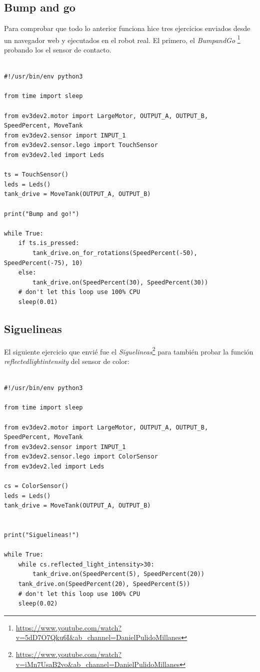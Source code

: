 \subsection{Bump and go}
Para comprobar que todo lo anterior funciona hice tres ejercicios enviados desde un navegador web y ejecutados en el robot real. El primero, el \textit{BumpandGo} \footnote{\url{https://www.youtube.com/watch?v=5dD7O7Qku6I&ab_channel=DanielPulidoMillanes}} probando los el sensor de contacto.

\begin{lstlisting}[frame=single,breaklines=true, label=Bump and Go, caption=Bump and Go,  captionpos=b]

#!/usr/bin/env python3

from time import sleep

from ev3dev2.motor import LargeMotor, OUTPUT_A, OUTPUT_B, SpeedPercent, MoveTank
from ev3dev2.sensor import INPUT_1
from ev3dev2.sensor.lego import TouchSensor
from ev3dev2.led import Leds

ts = TouchSensor()
leds = Leds()
tank_drive = MoveTank(OUTPUT_A, OUTPUT_B)

print("Bump and go!")

while True:
    if ts.is_pressed:
        tank_drive.on_for_rotations(SpeedPercent(-50), SpeedPercent(-75), 10)
    else:
        tank_drive.on(SpeedPercent(30), SpeedPercent(30))
    # don't let this loop use 100% CPU
    sleep(0.01)

\end{lstlisting}



\subsection{Siguelineas}

El siguiente ejercicio que envié fue el \textit{Siguelineas}\footnote{\url{https://www.youtube.com/watch?v=iMn7UsaB2vo&ab_channel=DanielPulidoMillanes}} para también probar la función \textit{reflectedlightintensity} del sensor de color:
 
 \begin{lstlisting}[frame=single,breaklines=true, label=Siguelineas, caption=SigueLineas,  captionpos=b]

#!/usr/bin/env python3

from time import sleep

from ev3dev2.motor import LargeMotor, OUTPUT_A, OUTPUT_B, SpeedPercent, MoveTank
from ev3dev2.sensor import INPUT_1
from ev3dev2.sensor.lego import ColorSensor
from ev3dev2.led import Leds

cs = ColorSensor()
leds = Leds()
tank_drive = MoveTank(OUTPUT_A, OUTPUT_B)


print("Siguelineas!")

while True:
    while cs.reflected_light_intensity>30:
        tank_drive.on(SpeedPercent(5), SpeedPercent(20))
    tank_drive.on(SpeedPercent(20), SpeedPercent(5))
    # don't let this loop use 100% CPU
    sleep(0.02)

\end{lstlisting}


